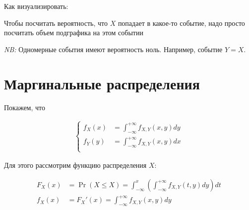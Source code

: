 \documentclass[12pt]{article}
\begin{document}
Как визуализировать:

\begin{center}
\end{center}

Чтобы посчитать вероятность, что $X$ попадает в какое-то событие, надо просто посчитать объем подграфика на этом событии

\emph{NB:} Одномерные события имеют вероятность ноль. Например, событие $Y = X$.

\section{Маргинальные распределения}
 Покажем, что 

 \begin{align*}
   \begin{cases}
    f_X(x) &= \int_{-\infty}^{+\infty} f_{X, Y}(x, y) dy \\
    f_Y(y) &= \int_{-\infty}^{+\infty} f_{X, Y}(x, y) dx \\
   \end{cases}
 \end{align*}

 Для этого рассмотрим функцию распределения $X$:

\begin{align*}
  F_X(x) &= \Pr(X \le X) = \int_{-\infty}^x \left(\int_{-\infty}^{+\infty} f_{X, Y} (t, y) dy\right) dt  \\
  f_X(x) &= F_X'(x) = \int_{-\infty}^{+\infty} f_{X, Y} (x, y) dy
\end{align*}
\end{document}
